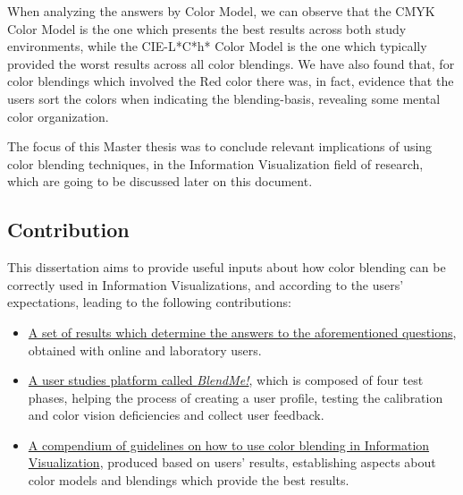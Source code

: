%
When analyzing the answers by Color Model, we can observe that the CMYK Color Model is the one which presents the best
results across both study environments, while the CIE-L*C*h* Color Model is the one which typically provided the worst
results across all color blendings. We have also found that, for color blendings which involved the Red color there was,
in fact, evidence that the users sort the colors when indicating the blending-basis, revealing some mental color organization. \par
%
The focus of this Master thesis was to conclude relevant implications of using color blending techniques, in the Information
Visualization field of research, which are going to be discussed later on this document.
%
\subsection{Contribution}
%
This dissertation aims to provide useful inputs about how color blending can be correctly used in Information Visualizations,
and according to the users' expectations, leading to the following contributions:
%
\begin{itemize}
  \item \ul{A set of results which determine the answers to the aforementioned questions}, obtained with online and laboratory
  users.
  \item \ul{A user studies platform called \emph{BlendMe!}}, which is composed of four test phases, helping the process of creating
  a user profile, testing the calibration and color vision deficiencies and collect user feedback.
  \item \ul{A compendium of guidelines on how to use color blending in Information Visualization}, produced based on users'
  results, establishing aspects about color models and blendings which provide the best results.
\end{itemize}

